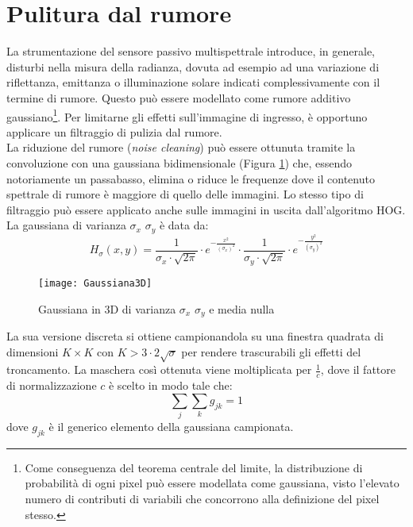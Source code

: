 
\section{Pulitura dal rumore}

La strumentazione del sensore passivo multispettrale introduce, in generale, disturbi nella misura della radianza, dovuta ad esempio ad una variazione di riflettanza, emittanza o illuminazione solare indicati complessivamente con il termine di rumore. 
Questo può essere modellato come rumore additivo gaussiano\footnote{Come conseguenza del teorema centrale del limite, la distribuzione di probabilità di ogni pixel può essere modellata come gaussiana, visto l'elevato numero di contributi di variabili che concorrono alla definizione del pixel stesso.}.
Per limitarne gli effetti sull'immagine di ingresso, è opportuno applicare un filtraggio di pulizia dal rumore.\\

La riduzione del rumore (\emph{noise cleaning}) può essere ottunuta tramite la convoluzione con una gaussiana bidimensionale (Figura \ref{fig:Gaussiana3D}) che, essendo notoriamente un passabasso, elimina o riduce le frequenze dove il contenuto spettrale di rumore è maggiore di quello delle immagini.
Lo stesso tipo di filtraggio può essere applicato anche sulle immagini in uscita dall'algoritmo HOG.\\


La gaussiana di varianza $\sigma_{x}$ $\sigma_{y}$ è data da:
\begin{equation}
\label{eq:Gaussiana_continua}
H_{\sigma}(x,y)= \frac{1}{\sigma_{x}\cdot \sqrt{2\pi}}\cdot e^{-\frac{x^{2}}{(\sigma_{x})^{2}}}\cdot\frac{1}{\sigma_{y}\cdot \sqrt{2\pi}}\cdot e^{-\frac{y^{2}}{(\sigma_{y})^{2}}}
\end{equation}

\begin{figure}[!ht]
\texttt{[image: Gaussiana3D]}
\caption{Gaussiana in 3D di varianza $\sigma_{x}$ $\sigma_{y}$ e media nulla}
\label{fig:Gaussiana3D}
\end{figure}

La sua versione discreta si ottiene campionandola su una finestra quadrata di dimensioni $K \times K$ con $K> 3\cdot 2 \sqrt{\sigma}$ per rendere trascurabili gli effetti del troncamento. 
La maschera così ottenuta viene moltiplicata per $\frac{1}{c}$, dove il fattore di normalizzazione $c$ è  scelto in modo tale che: 
\begin{equation}
\label{eq:normalizzazione_gaussiana}
\sum_j\sum_k g_{jk} = 1
\end{equation} 
dove $g_{jk}$ è il generico elemento della gaussiana campionata.


